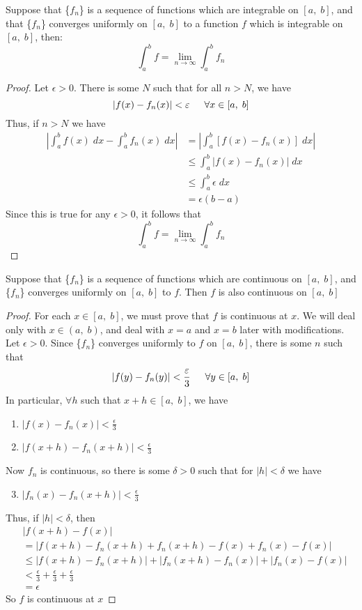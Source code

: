 \begin{theorem}
    Suppose that \{$f_n$\} is a sequence of functions which are integrable on $[a,\;b]$, and that \{$f_n$\} converges uniformly on $[a,\;b]$ to a function $f$ which is integrable on $[a,\; b]$, then:
    $$\int_a^b f = \lim_{n\to\infty}\int_a^bf_n$$
\end{theorem}
\begin{proof}
    Let $\epsilon > 0$. There is some $N$ such that for all $n>N$, we have 
    $$|f(x)-f_n(x)|<\epsilon \indent \forall x \in [a,\;b]$$
    Thus, if $n>N$ we have
    \begin{align*}
      \left|\int_a^bf(x)\;dx - \int _a^b f_n(x)\;dx \right| &= \left|\int_a^b [f(x) - f_n(x)]\;dx  \right|  \\
      &\leq \int _a^b |f(x) - f_n(x)| \; dx \\
      &\leq \int_a^b \epsilon\; dx \\
      &= \epsilon(b-a)
    \end{align*}
    Since this is true for any $\epsilon > 0$, it follows that 
    $$\int_a^b f = \lim_{n\to\infty}\int_a^bf_n$$
\end{proof}
\begin{theorem}
    Suppose that \{$f_n$\} is a sequence of functions which are continuous on $[a,\;b]$, and \{$f_n$\} converges uniformly on $[a,\;b]$ to $f$. Then $f$ is also continuous on $[a,\;b]$
\end{theorem}
\begin{proof}
    For each $x \in [a,\;b]$, we must prove that $f$ is continuous at $x$. We will deal only with $x \in (a,\; b)$, and deal with $x=a$ and $x=b$ later with modifications. \\
    Let $\epsilon > 0$. Since \{$f_n$\} converges uniformly to $f$ on $[a,\;b]$, there is some $n$ such that
    $$|f(y)-f_n(y)|<\frac{\epsilon}{3} \indent \forall y\in[a,\;b]$$
    In particular, $\forall h$ such that $x+h \in [a,\;b]$, we have
    \begin{enumerate}
        \item $|f(x)-f_n(x)| < \frac{\epsilon}{3}$ 
        \item $|f(x+h) - f_n(x+h)| < \frac{\epsilon}{3}$
    \end{enumerate}
    Now $f_n$ is continuous, so there is some $\delta > 0$ such that for $|h|<\delta$ we have 
    \begin{enumerate}
        \setcounter{enumi}{2}
        \item $|f_n(x)-f_n(x+h)| < \frac{\epsilon}{3}$
    \end{enumerate}
    Thus, if $|h| < \delta$, then 
    \begin{align*}
        & |f(x+h) - f(x)| \\
        & = |f(x+h)-f_n(x+h)+f_n(x+h)-f(x)+f_n(x)-f(x)| \\
        &\leq |f(x+h)-f_n(x+h)|+|f_n(x+h)-f_n(x)| + |f_n(x)-f(x)| \\
        &< \frac{\epsilon}{3} + \frac{\epsilon}{3}+\frac{\epsilon}{3} \\
        &= \epsilon
    \end{align*}
    So $f$ is continuous at $x$
\end{proof}

